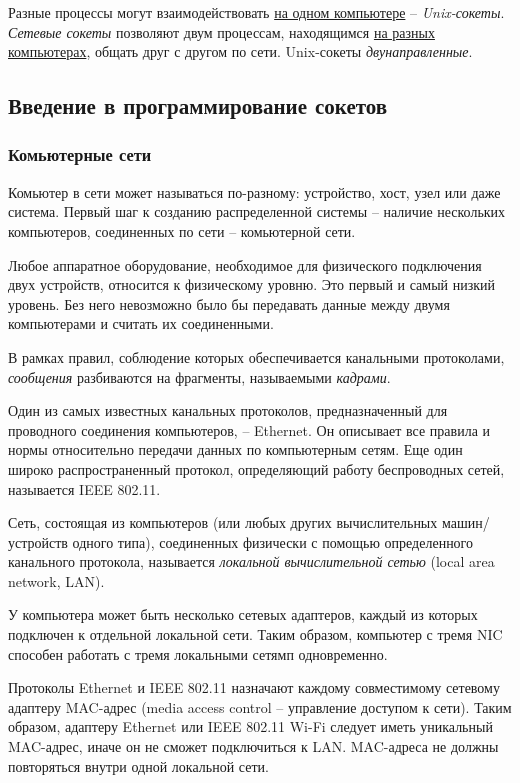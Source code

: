 \documentclass[%
	11pt,
	a4paper,
	utf8,
		]{article}
\begin{document}
Разные процессы могут взаимодействовать \underline{на одном компьютере} -- \emph{Unix-сокеты}. \emph{Сетевые сокеты} позволяют двум процессам, находящимся \underline{на разных компьютерах}, общать друг с другом по сети. Unix-сокеты \emph{двунаправленные}.

\subsection{Введение в программирование сокетов}

\subsubsection{Комьютерные сети}

Комьютер в сети может называться по-разному: устройство, хост, узел или даже система. Первый шаг к созданию распределенной системы -- наличие нескольких компьютеров, соединенных по сети -- комьютерной сети.

Любое аппаратное оборудование, необходимое для физического подключения двух устройств, относится к физическому уровню. Это первый и самый низкий уровень. Без него невозможно было бы передавать данные между двумя компьютерами и считать их соединенными.

В рамках правил, соблюдение которых обеспечивается канальными протоколами, \emph{сообщения} разбиваются на фрагменты, называемыми \emph{кадрами}.

Один из самых известных канальных протоколов, предназначенный для проводного соединения компьютеров, -- Ethernet. Он описывает все правила и нормы относительно передачи данных по компьютерным сетям. Еще один широко распространенный протокол, определяющий работу беспроводных сетей, называется IEEE 802.11.

Сеть, состоящая из компьютеров (или любых других вычислительных машин/устройств одного типа), соединенных физически с помощью определенного канального протокола, называется \emph{локальной вычислительной сетью} (local area network, LAN). 

У компьютера может быть несколько сетевых адаптеров, каждый из которых подключен к отдельной локальной сети. Таким образом, компьютер с тремя NIC способен работать с тремя локальными сетямп одновременно.

Протоколы Ethernet и IEEE 802.11 назначают каждому совместимому сетевому адаптеру MAC-адрес (media access control -- управление доступом к сети). Таким образом, адаптеру Ethernet или IEEE 802.11 Wi-Fi следует иметь уникальный MAC-адрес, иначе он не сможет подключиться к LAN. MAC-адреса не должны повторяться внутри одной локальной сети.
\end{document}
